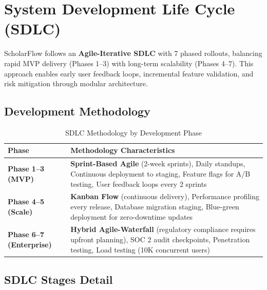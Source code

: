\section{System Development Life Cycle (SDLC)}

ScholarFlow follows an \textbf{Agile-Iterative SDLC} with 7 phased rollouts, balancing rapid MVP delivery (Phases 1--3) with long-term scalability (Phases 4--7). This approach enables early user feedback loops, incremental feature validation, and risk mitigation through modular architecture.

\subsection{Development Methodology}

\begin{table}[H]
    \centering
    \small
    \begin{tabular}{|l|p{10cm}|}
        \hline
        \textbf{Phase}                   & \textbf{Methodology Characteristics}                                                                                              \\
        \hline
        \textbf{Phase 1--3 (MVP)}        &
        \textbf{Sprint-Based Agile} (2-week sprints), Daily standups, Continuous deployment to staging, Feature flags for A/B testing, User feedback loops every 2 sprints   \\
        \hline
        \textbf{Phase 4--5 (Scale)}      &
        \textbf{Kanban Flow} (continuous delivery), Performance profiling every release, Database migration staging, Blue-green deployment for zero-downtime updates         \\
        \hline
        \textbf{Phase 6--7 (Enterprise)} &
        \textbf{Hybrid Agile-Waterfall} (regulatory compliance requires upfront planning), SOC 2 audit checkpoints, Penetration testing, Load testing (10K concurrent users) \\
        \hline
    \end{tabular}
    \caption{SDLC Methodology by Development Phase}
    \label{table:sdlc-methodology}
\end{table}


\subsection{SDLC Stages Detail}

